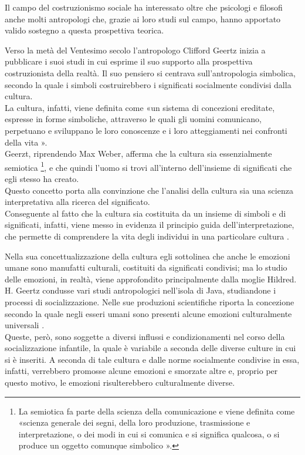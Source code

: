 Il campo del costruzionismo sociale ha interessato oltre che psicologi e filosofi anche molti antropologi che, grazie ai loro studi sul campo, hanno apportato valido sostegno a questa prospettiva teorica. 

Verso la metà del Ventesimo secolo l'antropologo Clifford Geertz inizia a pubblicare i suoi studi in cui esprime il suo supporto alla prospettiva costruzionista della realtà. Il suo pensiero si centrava sull'antropologia simbolica, secondo la quale i simboli costruirebbero i significati socialmente condivisi dalla cultura.\\
La cultura, infatti, viene definita come «un sistema di concezioni ereditate, espresse in forme simboliche, attraverso le quali gli uomini comunicano, perpetuano e sviluppano le loro conoscenze e i loro atteggiamenti nei confronti della vita \parencite{geertz}».\\
Geerzt, riprendendo Max Weber, afferma che la cultura sia essenzialmente semiotica \footnote{La semiotica fa parte della scienza della comunicazione e viene definita come «scienza generale dei segni, della loro produzione, trasmissione e interpretazione, o dei modi in cui si comunica e si significa qualcosa, o si produce un oggetto comunque simbolico \parencite{semiotica}».}, e che quindi l'uomo si trovi all'interno dell'insieme di significati che egli stesso ha creato.\\
Questo concetto porta alla convinzione che l'analisi della cultura sia una scienza interpretativa alla ricerca del significato.\\
Conseguente al fatto che la cultura sia costituita da un insieme di simboli e di significati, infatti, viene messo in evidenza il principio guida dell'interpretazione, che permette di comprendere la vita degli individui in una particolare cultura \parencite{geertz}. 

Nella sua concettualizzazione della cultura egli sottolinea che anche le emozioni umane sono manufatti culturali, costituiti da significati condivisi; ma lo studio delle emozioni, in realtà, viene approfondito principalmente dalla moglie Hildred.\\
H. Geertz condusse vari studi antropologici nell'isola di Java, studiandone i processi di socializzazione. Nelle sue produzioni scientifiche riporta la concezione secondo la quale negli esseri umani sono presenti alcune emozioni culturalmente universali \parencite{hildred_geertz}.\\
Queste, però, sono soggette a diversi influssi e condizionamenti nel corso della socializzazione infantile, la quale è variabile a seconda delle diverse culture in cui si è inseriti. A seconda di tale cultura e dalle norme socialmente condivise in essa, infatti, verrebbero promosse alcune emozioni e smorzate altre e, proprio per questo motivo, le emozioni risulterebbero culturalmente diverse. 


